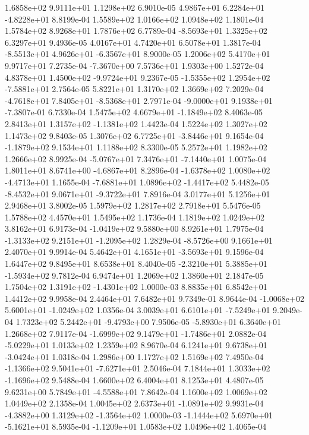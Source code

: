 1.6858e+02 9.9111e+01 1.1298e+02  6.9010e-05
 4.9867e+01  6.2284e+01 -4.8228e+01  8.8199e-04
1.5589e+02 1.0166e+02 1.0948e+02  1.1801e-04
1.5784e+02 8.9268e+01 1.7876e+02  6.7789e-04
-8.5693e+01  1.3325e+02  6.3297e+01  9.4936e-05
4.0167e+01 4.7420e+01 6.5078e+01  1.3817e-04
-8.5513e+01  4.9626e+01 -6.3567e+01  8.9000e-05
1.2006e+02 5.4170e+01 9.9717e+01  7.2735e-04
-7.3670e+00  7.5736e+01  1.9303e+00  1.5272e-04
 4.8378e+01  1.4500e+02 -9.9724e+01  9.2367e-05
-1.5355e+02  1.2954e+02 -7.5881e+01  2.7564e-05
5.8221e+01 1.3170e+02 1.3669e+02  7.2029e-04
-4.7618e+01  7.8405e+01 -8.5368e+01  2.7971e-04
-9.0000e+01  9.1938e+01 -7.3807e-01  6.7330e-04
 1.5475e+02  4.6679e+01 -1.1849e+02  8.4063e-05
 2.8413e+01  1.3157e+02 -1.1381e+02  1.4423e-04
1.5224e+02 1.3027e+02 1.1473e+02  9.8403e-05
 1.3076e+02  6.7725e+01 -3.8446e+01  9.1654e-04
-1.1879e+02  9.1534e+01  1.1188e+02  8.3300e-05
5.2572e+01 1.1982e+02 1.2666e+02  8.9925e-04
-5.0767e+01  7.3476e+01 -7.1440e+01  1.0075e-04
 1.8011e+01  8.6741e+00 -4.6867e+01  8.2896e-04
-1.6378e+02  1.0080e+02 -4.4713e+01  1.1655e-04
-7.6881e+01  1.0896e+02 -1.4417e+02  5.4482e-05
-8.4532e+01  9.0671e+01 -9.3722e+01  7.8916e-04
3.0177e+01 5.1256e+01 2.9468e+01  3.8002e-05
1.5979e+02 1.2817e+02 2.7918e+01  5.5476e-05
1.5788e+02 4.4570e+01 1.5495e+02  1.1736e-04
1.1819e+02 1.0249e+02 3.8162e+01  6.9173e-04
-1.0419e+02  9.5880e+00  8.9261e+01  1.7975e-04
-1.3133e+02  9.2151e+01 -1.2095e+02  1.2829e-04
-8.5726e+00  9.1661e+01  2.4070e+01  9.9914e-04
 5.4642e+01  4.1651e+01 -3.5693e+01  9.1596e-04
1.6447e+02 9.8495e+01 8.6538e+01  8.4040e-05
-2.3210e+01  5.3885e+01 -1.5934e+02  9.7812e-04
6.9474e+01 1.2069e+02 1.3860e+01  2.1847e-05
 1.7504e+02  1.3191e+02 -1.4301e+02  1.0000e-03
8.8835e+01 6.8542e+01 1.4412e+02  9.9958e-04
2.4464e+01 7.6482e+01 9.7349e-01  8.9644e-04
-1.0068e+02  5.6001e+01 -1.0249e+02  1.0356e-04
 3.0039e+01  6.6101e+01 -7.5249e+01  9.2049e-04
 1.7323e+02  5.2442e+01 -9.4793e+00  7.9506e-05
-5.8930e+01  6.3640e+01  1.2668e+02  7.9117e-04
-1.6999e+02  9.1479e+01 -1.7486e+01  2.0882e-04
-5.0229e+01  1.0133e+02  1.2359e+02  8.9670e-04
 6.1241e+01  9.6738e+01 -3.0424e+01  1.0318e-04
1.2986e+00 1.1727e+02 1.5169e+02  7.4950e-04
-1.1366e+02  9.5041e+01 -7.6271e+01  2.5046e-04
 7.1844e+01  1.3033e+02 -1.1696e+02  9.5488e-04
1.6600e+02 6.4004e+01 8.1253e+01  4.4807e-05
 9.6231e+00  5.7849e+01 -4.5588e+01  7.8642e-04
1.1600e+02 1.0069e+02 1.0449e+02  2.1358e-04
 1.0045e+02  2.6373e+01 -1.0891e+02  9.9931e-04
-4.3882e+00  1.3129e+02 -1.3564e+02  1.0000e-03
-1.1444e+02  5.6970e+01 -5.1621e+01  8.5935e-04
-1.1209e+01  1.0583e+02  1.0496e+02  1.4065e-04
